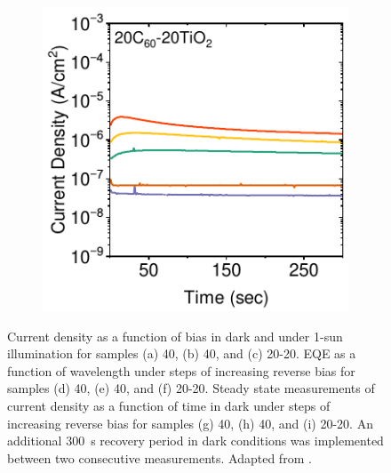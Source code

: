 \begin{figure}[ht!]
\begin{subfigure}[b]{0.32\textwidth}
        \caption{}
    \end{subfigure}
    \hfill
    \begin{subfigure}[b]{0.32\textwidth}
        \centering
        \includegraphics[width=\textwidth]{chapters/transport_layers/images/StaticJV_20_20.pdf}
        \caption{}
    \end{subfigure}

    \caption[Overview of electrical characterization results for PePDs with 40 nm of , 40 nm of , or  20 nm of  and 20 nm of  as the ETL.]{Current density as a function of bias in dark and under 1-sun illumination for samples (a) 40, (b) 40, and (c) 20-20. EQE as a function of wavelength under steps of increasing reverse bias for samples (d) 40, (e) 40, and (f) 20-20. Steady state measurements of current density as a function of time in dark under steps of increasing reverse bias for samples (g) 40, (h) 40, and (i) 20-20. An additional 300~s recovery period in dark conditions was implemented between two consecutive measurements. Adapted from \cite{Papadopoulou2025ElectronSpeed}.}
    \label{fig:etl_opt:dynamicjv_eqe_staticjv}
\end{figure}

